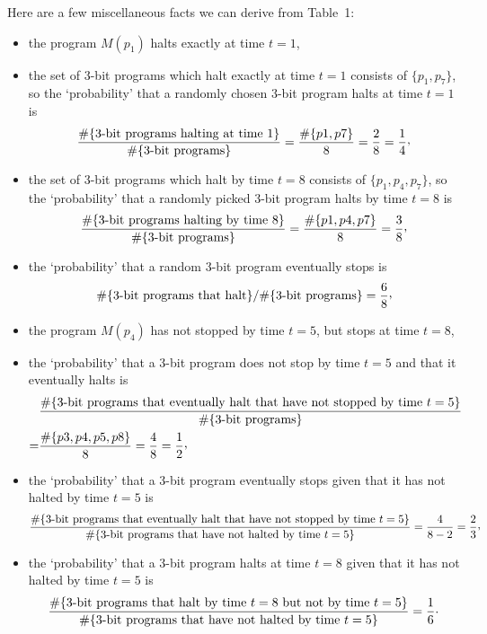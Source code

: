 \documentclass[12pt,twoside,openright]{report}
\begin{document}
Here are a few miscellaneous facts we can derive from Table~1:
\begin{itemize}
\item the program  $M(p_{1})$ halts exactly at time $t=1$,
\item the set of 3-bit programs which halt exactly at time $t=1$ consists of $\{p_{1}, p_{7}\}$, so the `probability' that a randomly chosen 3-bit program halts at time $t=1$ is 
\[\frac{\#\{\mbox{3-bit programs halting at time 1}\}}{\#\{\mbox{3-bit programs}\}} = \frac{\#\{p1, p7\}}{8} = \frac{2}{8}=\frac{1}{4}\raisebox{0.4ex}{,}\]


\item the set of 3-bit programs which halt  by time $t=8$ consists of $\{p_{1},  p_{4}, p_{7}\}$, so the `probability' that a randomly picked  3-bit program halts by time $t=8$ is 
\[\frac{\#\{\mbox{3-bit programs halting by time 8}\}}{\#\{\mbox{3-bit programs}\}} = \frac{\#\{p1, p4, p7\}}{8} = \frac{3}{8}\raisebox{0.4ex}{,}\]

\item the `probability' that a random 3-bit program eventually stops is 
\[\#\{\mbox{3-bit programs that halt}\}/ \#\{\mbox{3-bit programs}\}=\frac{6}{8}\raisebox{0.4ex}{,}\]

\item the program  $M(p_{4})$ has not stopped by time $t=5$, but stops at time $t=8$,

\item the `probability' that a 3-bit program does not stop by time $t=5$ and that it eventually halts is 
\begin{align*}
  & \frac{\#\{\mbox{3-bit programs that eventually halt that have not stopped by time }t=5\}}{\#\{\mbox{3-bit programs}\}} \\
  = & \frac{\#\{p3, p4, p5, p8\}}{8} = \frac{4}{8} = \frac{1}{2}\raisebox{0.4ex}{,}
\end{align*}

\item the `probability' that a 3-bit program eventually stops given that it has not halted by time $t=5$ is 
\[\frac{\#\{\mbox{3-bit programs that eventually halt that have not stopped by time }t=5\}}{\#\{\mbox{3-bit programs that have not halted by time }t=5\}} = \frac{4}{8-2} = \frac{2}{3}\raisebox{0.4ex}{,}\]

\item the `probability' that a 3-bit program halts at time $t=8$ given that it has not halted by time $t=5$ is 
\[\frac{\#\{\mbox{3-bit programs that halt by time }t=8 \mbox{ but not by time } t=5\}}{\#\{\mbox{3-bit programs that have not halted by time }t=5\}} = \frac{1}{6}\raisebox{0.4ex}.\]
\end{itemize}
\end{document}
